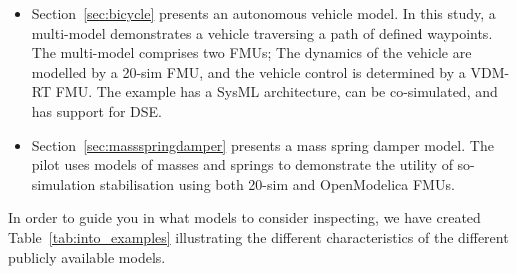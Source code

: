 \begin{itemize}
  \item Section~\ref{sec:bicycle} presents an autonomous vehicle model. In this study, a multi-model demonstrates a vehicle traversing a path of defined waypoints. The multi-model comprises two FMUs; The dynamics of the vehicle are modelled by a 20-sim FMU, and the vehicle control is determined by a VDM-RT FMU. The example has a SysML architecture, can be co-simulated, and has support for DSE.
  \item Section~\ref{sec:massspringdamper} presents a mass spring damper model. The pilot uses models of masses and springs to demonstrate the utility of so-simulation stabilisation using both 20-sim and OpenModelica FMUs.
 
  
\end{itemize}

In order to guide you in what models to consider inspecting, we have created Table~\ref{tab:into_examples} illustrating the different characteristics of the different publicly available models. 


